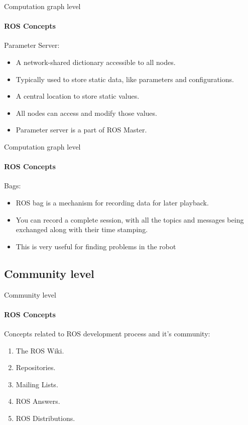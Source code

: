 \documentclass{beamer}
\begin{document}
\begin{frame}{Computation graph level}
    \framesubtitle{ROS Concepts}
    {\huge Parameter Server:}
    \vspace{0.2cm}
    \begin{itemize}
        \item A network-shared dictionary accessible to all nodes.
        \item Typically used to store static data, like parameters and configurations.
        \item A central location to store static values.
        \item  All nodes can access and modify those values.
        \item Parameter server is a part of ROS Master.
    \end{itemize}  
\end{frame}


\begin{frame}{Computation graph level}
    \framesubtitle{ROS Concepts}
    {\huge Bags:}
    \vspace{0.2cm}
    \begin{itemize}
        \item ROS bag is a mechanism for recording data for later playback.
        \item You can record a complete session, with all the topics and messages
        being exchanged along with their time stamping.
        
        \item This is very useful for finding problems in the robot
    \end{itemize}  
\end{frame}
    
\subsection{Community level}
\begin{frame}{Community level}
    \framesubtitle{ROS Concepts}
    
    Concepts related to ROS development process and it's community:
    
    \begin{enumerate}
        \item The ROS Wiki.
        \item Repositories.
        \item Mailing Lists.
        \item ROS Answers.
        \item ROS Distributions.
    \end{enumerate}
\end{frame}
\end{document}
